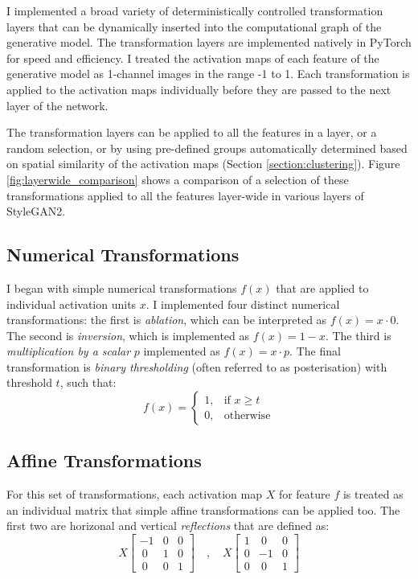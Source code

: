 I implemented a broad variety of deterministically controlled transformation layers that can be dynamically inserted into the computational graph of the generative model. 
The transformation layers are implemented natively in PyTorch \citep{paszke2019pytorch} for speed and efficiency. I
 treated the activation maps of each feature of the generative model as 1-channel images in the range -1 to 1. 
 Each transformation is applied to the activation maps individually before they are passed to the next layer of the network. 

 The transformation layers can be applied to all the features in a layer, or a random selection, or by using pre-defined groups automatically determined based on spatial similarity of the activation maps (Section \ref{section:clustering}). 
 Figure \ref{fig:layerwide_comparison} shows a comparison of a selection of these transformations applied to all the features layer-wide in various layers of StyleGAN2.

\subsection{Numerical Transformations}

I began with simple numerical transformations $f(x)$ that are applied to individual activation units $x$. 
I implemented four distinct numerical transformations: the first is \emph{ablation}, which can be interpreted as $f(x) = x \cdot 0$. 
The second is \emph{inversion}, which is implemented as $f(x) = 1 - x$. 
The third is \emph{multiplication by a scalar} $p$ implemented as $f(x) = x \cdot p$. 
The final transformation is \emph{binary thresholding} (often referred to  as posterisation) with threshold $t$, such that:
\begin{equation}
f(x) = \begin{cases}
    1,& \text{if } x\geq t\\
    0,              & \text{otherwise}
\end{cases}
\end{equation}

\subsection{Affine Transformations}
\label{sec:affine}
For this set of transformations, each activation map $X$ for feature $f$ is treated as an individual matrix that simple affine transformations can be applied too. 
The first two are horizonal and vertical \emph{reflections} that are defined as:
\begin{equation}
X \begin{bmatrix}
-1 & 0 & 0\\
\ 0 & 1 & 0\\
\ 0 & 0 & 1
\end{bmatrix}\quad , \quad X \begin{bmatrix}
1 & \ 0 & 0\\
0 & -1 & 0\\
0 & \ 0 & 1
\end{bmatrix}
\end{equation}

